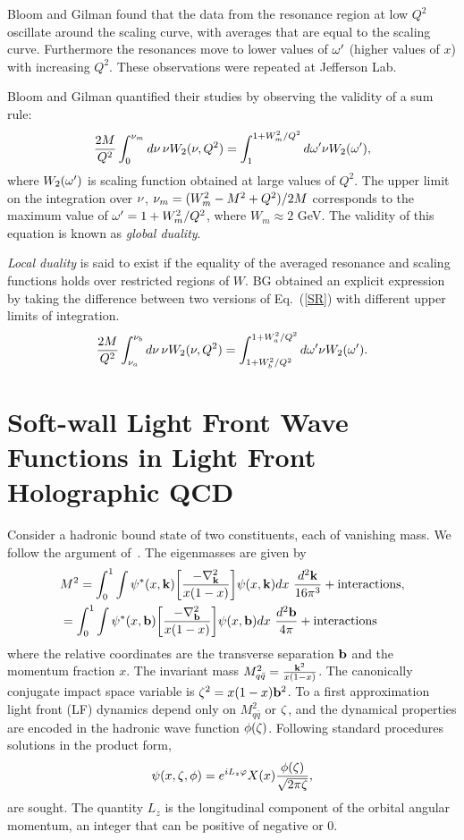 \documentclass[aps,prd,amsmath,longbibliography]{revtex4-1}
\newcommand{\eq}[1]{Eq.~(\ref{#1})}
\def\bea{\begin{eqnarray}}
\def\eea{\end{eqnarray}}\def\a{\alpha}\newcommand{\bfk}{{\bf k}}\newcommand{\bfq}{{\bf q}}
\begin{document}
{Bloom and Gilman found that the data from the resonance region at low $Q^2$ oscillate around the scaling curve, with averages that are equal to the scaling curve. Furthermore the resonances move to  lower values of $\omega'$ (higher values of $x$) with increasing $Q^2$. These observations were repeated at Jefferson Lab.

Bloom and Gilman quantified their studies  by observing the validity of a sum rule:
\bea {2M\over Q^2} \int_0^{\n_m}d\n\,\n W_2(\n,Q^2)= \int_1^{1+W_m^2/Q^2}d\o'\n W_2(\o'),\label{SR}\eea
where $W_2(\omega')$ is scaling function obtained at large values of $Q^2$. The upper limit on the integration over  $\nu$, $\nu_m=(W_m^2-M^2+Q^2)/2M$ corresponds to the maximum value of $\omega'=1+W_m^2/Q^2$, where $W_m\approx 2$ GeV.  The validity of this equation is known as {\it global duality}.

{\it Local duality} is said to exist if the equality of the averaged resonance and scaling functions holds over restricted regions of $W$. 
BG obtained an explicit expression by taking the difference between two versions of \eq{SR}  with different upper limits of integration.
\bea {2M\over Q^2} \int_{\n_a}^{\n_b}d\n\,\n W_2(\n,Q^2)= \int_{1+W_b^2/Q^2}^{1+W_a^2/Q^2}d\o'\n W_2(\o').\label{LSR}\eea
 
\section{Soft-wall Light Front Wave Functions in Light Front Holographic QCD}
Consider a  hadronic bound state of  two constituents, each of vanishing mass.  We follow the argument of~\cite{Brodsky:2014yha}.
The eigenmasses are given by
\bea& M^2 = \int_{0}^{1}\int\psi^*(x,\mathbf{k}  )\bigg[\dfrac{-\nabla^2_{\mathbf{k}  }  }{x(1-x)} \bigg]\psi(x,\mathbf{k}  )dx \ {d^2\mathbf{k}\over 16\pi^3}   + \text{interactions},\notag\\&
= \int_{0}^{1}\int\psi^*(x,\mathbf{b}  )\bigg[\dfrac{-\nabla^2_{\mathbf{b}  }  }{x(1-x)} \bigg]\psi(x,\mathbf{b}  )dx \ {d^2\mathbf{b}\over 4\pi}   + \text{interactions}\label{msq}
\eea
where
the relative coordinates are the transverse separation  ${\bf b}  $ and the momentum fraction $x$. 
 The invariant mass $M_{q\bar q}^2={\bfk^2\over x(1-x)}$. The canonically conjugate impact space variable is $\zeta^2=x(1-x){\bf b}^2$. To a first approximation light front (LF) dynamics depend only on $M_{q\bar q}^2$ or $\zeta$, and the dynamical properties are encoded in the hadronic wave function $\phi(\zeta)$. Following standard procedures solutions in the product form,
\bea \psi(x,\z,\phi)=e^{i L_z\varphi}X(x){\phi(\z)\over \sqrt{2\pi \z}},\label{wf0}\eea
are sought. %
The quantity $L_z$ is the longitudinal component of the orbital angular momentum, an integer that can be positive of negative or 0.

}
\end{document}
